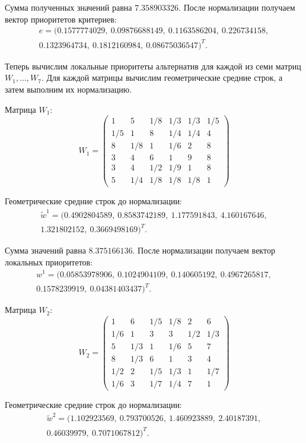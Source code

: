 Сумма полученных значений равна $7.358903326$. После нормализации получаем вектор приоритетов критериев:
\begin{gather*}
e = (0.1577774029,\ 0.09876688149,\ 0.1163586204,\ 0.226734158,\\ 0.1323964734,\ 0.1812160984,\ 0.08675036547)^T.
\end{gather*}


Теперь вычислим локальные приоритеты альтернатив для каждой из семи матриц $W_1, \ldots, W_7$. Для каждой матрицы вычислим геометрические средние строк, а затем выполним их нормализацию.


Матрица $W_1$:
\[
W_1 = \begin{pmatrix}
1 & 5 & 1/8 & 1/3 & 1/3 & 1/5 \\
1/5 & 1 & 8 & 1/4 & 1/4 & 4 \\
8 & 1/8 & 1 & 1/6 & 2 & 8 \\
3 & 4 & 6 & 1 & 9 & 8 \\
3 & 4 & 1/2 & 1/9 & 1 & 8 \\
5 & 1/4 & 1/8 & 1/8 & 1/8 & 1
\end{pmatrix}
\]

Геометрические средние строк до нормализации:
\begin{gather*}
\tilde{w}^1 = (0.4902804589,\ 0.8583742189,\ 1.177591843,\ 4.160167646,\\ 1.321802152,\ 0.3669498169)^T.
\end{gather*}

Сумма значений равна $8.375166136$. После нормализации получаем вектор локальных приоритетов:
\begin{gather*}
w^1 = (0.05853978906,\ 0.1024904109,\ 0.140605192,\ 0.4967265817,\\ 0.1578239919,\ 0.04381403437)^T.
\end{gather*}



Матрица $W_2$:
\[
W_2 = \begin{pmatrix}
1 & 6 & 1/5 & 1/8 & 2 & 6 \\
1/6 & 1 & 3 & 3 & 1/2 & 1/3 \\
5 & 1/3 & 1 & 1/6 & 5 & 7 \\
8 & 1/3 & 6 & 1 & 3 & 4 \\
1/2 & 2 & 1/5 & 1/3 & 1 & 1/7 \\
1/6 & 3 & 1/7 & 1/4 & 7 & 1
\end{pmatrix}
\]

Геометрические средние строк до нормализации:
\begin{gather*}
\tilde{w}^2 = (1.102923569,\ 0.793700526,\ 1.460923889,\ 2.40187391,\\ 0.46039979,\ 0.7071067812)^T.
\end{gather*}


